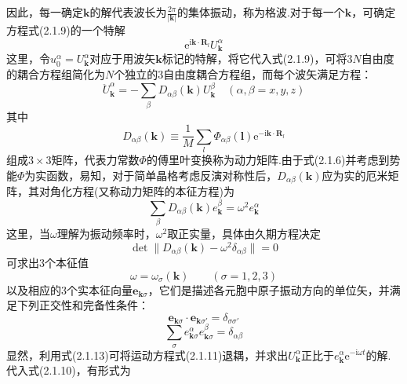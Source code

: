 因此，每一确定$\boldsymbol{k}$的解代表波长为$\frac{2\pi}{|\boldsymbol{k}|}$的集体振动，称为格波.对于每一个$\boldsymbol{k}$，可确定方程式(2.1.9)的一个特解
\begin{equation*}
  \mathrm{e}^{\mathrm{i}\boldsymbol{k}\cdot\boldsymbol{R}_l}U_{\boldsymbol{k}}^{\alpha}
\end{equation*}
这里，令$u_0^{\alpha}=U_{\boldsymbol{k}}^{\alpha}$对应于用波矢$\boldsymbol{k}$标记的特解，将它代入式(2.1.9)，可将$3N$自由度的耦合方程组简化为$N$个独立的3自由度耦合方程组，而每个波矢满足方程：
\begin{equation}
  \ddot{U}_{\boldsymbol{k}}^{\alpha}=-\sum_{\beta}D_{\alpha\beta}(\boldsymbol{k})U_{\boldsymbol{k}}^{\beta}
  \quad(\alpha,\beta=x,y,z)
\end{equation}
其中
\begin{equation}
  D_{\alpha\beta}(\boldsymbol{k})\equiv\frac{1}{M}\sum_{l}\Phi_{\alpha\beta}(\boldsymbol{l})
  \mathrm{e}^{-\mathrm{i}\boldsymbol{k}\cdot\boldsymbol{R}_l}
\end{equation}
组成$3\times3$矩阵，代表力常数$\Phi$的傅里叶变换称为动力矩阵.由于式(2.1.6)并考虑到势能$\Phi$为实函数，易知，对于简单晶格考虑反演对称性后，$D_{\alpha\beta}(\boldsymbol{k})$应为实的厄米矩阵，其对角化方程(又称动力矩阵的本征方程)为
\begin{equation}
  \sum_{\beta}D_{\alpha\beta}(\boldsymbol{k})e_{\boldsymbol{k}}^{\beta}
  =\omega^2e_{\boldsymbol{k}}^{\alpha}
\end{equation}
这里，当$\omega$理解为振动频率时，$\omega^2$取正实量，具体由久期方程决定
\begin{equation}
  \det\parallel D_{\alpha\beta}(\boldsymbol{k})-\omega^2\delta_{\alpha\beta}\parallel=0
\end{equation}
可求出3个本征值
\begin{equation}
  \omega=\omega_{\sigma}(\boldsymbol{k})\qquad(\sigma=1,2,3)
\end{equation}
以及相应的3个实本征向量$\boldsymbol{e}_{\boldsymbol{k}\sigma}$，它们是描述各元胞中原子振动方向的单位矢，并满足下列正交性和完备性条件：
\begin{equation}
  \boldsymbol{e}_{\boldsymbol{k}\sigma}\cdot\boldsymbol{e}_{\boldsymbol{k}\sigma'}=\delta_{\sigma\sigma'}
\end{equation}
\begin{equation}
  \sum_{\sigma}e_{\boldsymbol{k}\sigma}^{\alpha}e_{\boldsymbol{k}\sigma}^{\beta}=\delta_{\alpha\beta}
\end{equation}
显然，利用式(2.1.13)可将运动方程式(2.1.11)退耦，并求出$U_{\boldsymbol{k}}^{\alpha}$正比于$e_{\boldsymbol{k}}^{\alpha}\mathrm{e}^{-\mathrm{i}\omega t}$的解.代入式(2.1.10)，有形式为
